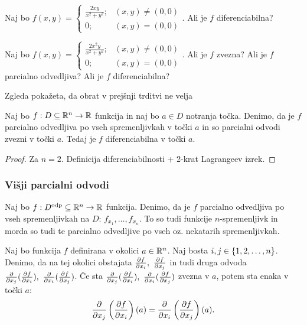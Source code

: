 \begin{zgled}
    Naj bo $f(x,y) = \begin{cases}
        \frac{2xy}{x^2+y^2}; &(x,y) \neq (0,0) \\
        0; &(x,y) = (0,0)
    \end{cases}$. Ali je $f$ diferenciabilna?
\end{zgled}

\begin{zgled}
    Naj bo $f(x,y) = \begin{cases}
        \frac{2x^2y}{x^2+y^2}; &(x,y) \neq (0,0) \\
        0; &(x,y) = (0,0)
    \end{cases}$. Ali je $f$ zvezna? Ali je $f$ parcialno odvedljiva? Ali je $f$ diferenciabilna?
\end{zgled}

\begin{opomba}
    Zgleda pokažeta, da obrat v prejšnji trditvi ne velja
\end{opomba}

\begin{izrek}
    Naj bo $f: D \subseteq \mathbb{R}^n \to \mathbb{R}$ funkcija in naj bo $a \in D$ notranja točka. Denimo, da je $f$ parcialno odvedljiva po vseh spremenljivkah v točki $a$ in so parcialni odvodi zvezni v točki $a$. Tedaj je $f$ diferenciabilna v točki $a$.
\end{izrek}

\begin{proof}
    Za $n=2$. Definicija diferenciabilnosti + 2-krat Lagrangeev izrek.
\end{proof}

\subsubsection{Višji parcialni odvodi}
Naj bo $f: D^{\text{odp}} \subseteq \mathbb{R}^n \to \mathbb{R}$ funkcija. Denimo, da je $f$ parcialno odvedljiva po vseh spremenljivkah na $D$: $f_{x_1}, \ldots, f_{x_n}$. To so tudi funkcije $n$-spremenljivk in morda so tudi te parcialno odvedljive po vseh oz. nekatarih spremenljivkah.

\begin{trditev}
    Naj bo funkcija $f$ definirana v okolici $a \in \mathbb{R}^n$. Naj bosta $i, j \in \left\{1, 2, \ldots, n\right\}$. Denimo, da na tej okolici obstajata $\frac{\partial f}{\partial x_i}, \ \frac{\partial f}{\partial x_j}$ in tudi druga odvoda $\frac{\partial}{\partial x_j} (\podv{f}{x_i}), \ \frac{\partial}{\partial x_i} (\podv{f}{x_j})$. Če sta $\frac{\partial}{\partial x_j} (\podv{f}{x_i}), \ \frac{\partial}{\partial x_i} (\podv{f}{x_j})$ zvezna v $a$, potem sta enaka v točki $a$: 
    $$\frac{\partial}{\partial x_j} \left(\frac{\partial f}{\partial x_i}\right)(a) = \frac{\partial}{\partial x_i} \left(\frac{\partial f}{\partial x_j}\right)(a).$$
\end{trditev}

